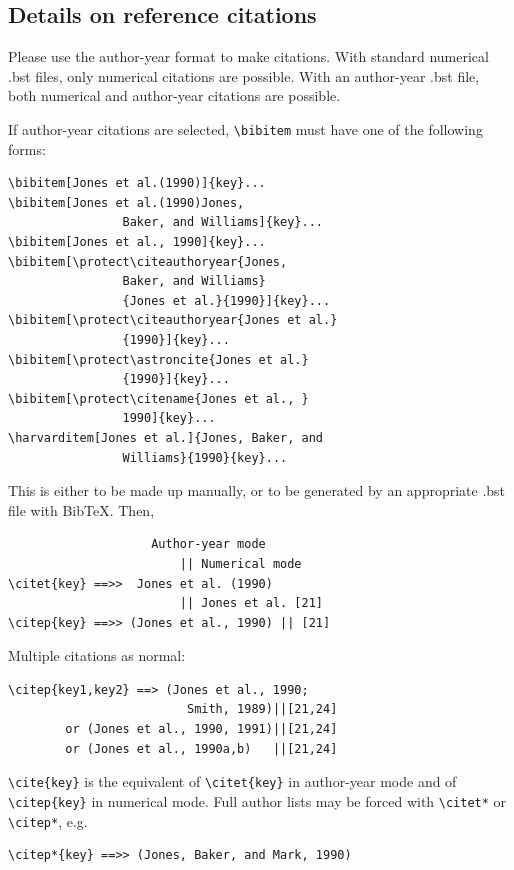 \documentclass[unnumsec,webpdf,modern,large]{mam-authoring-template}%
\theoremstyle{thmstyleone}%
\theoremstyle{thmstyletwo}%
\theoremstyle{thmstylethree}%
\begin{document}
\subsection{Details on reference citations}\label{subsec3}

Please use the author-year format to make citations. With standard numerical .bst files, only numerical citations are possible.
With an author-year .bst file, both numerical and author-year citations are possible.

If author-year citations are selected, \verb+\bibitem+ must have one of the following forms:


{\footnotesize%
\begin{verbatim}
\bibitem[Jones et al.(1990)]{key}...
\bibitem[Jones et al.(1990)Jones,
                Baker, and Williams]{key}...
\bibitem[Jones et al., 1990]{key}...
\bibitem[\protect\citeauthoryear{Jones,
                Baker, and Williams}
                {Jones et al.}{1990}]{key}...
\bibitem[\protect\citeauthoryear{Jones et al.}
                {1990}]{key}...
\bibitem[\protect\astroncite{Jones et al.}
                {1990}]{key}...
\bibitem[\protect\citename{Jones et al., }
                1990]{key}...
\harvarditem[Jones et al.]{Jones, Baker, and
                Williams}{1990}{key}...
\end{verbatim}}


This is either to be made up manually, or to be generated by an
appropriate .bst file with BibTeX. Then,


{%
\begin{verbatim}
                    Author-year mode
                        || Numerical mode
\citet{key} ==>>  Jones et al. (1990)
                        || Jones et al. [21]
\citep{key} ==>> (Jones et al., 1990) || [21]
\end{verbatim}}


\noindent
Multiple citations as normal:


{%
\begin{verbatim}
\citep{key1,key2} ==> (Jones et al., 1990;
                         Smith, 1989)||[21,24]
        or (Jones et al., 1990, 1991)||[21,24]
        or (Jones et al., 1990a,b)   ||[21,24]
\end{verbatim}}


\noindent
\verb+\cite{key}+ is the equivalent of \verb+\citet{key}+ in author-year mode
and  of \verb+\citep{key}+ in numerical mode. Full author lists may be forced with
\verb+\citet*+ or \verb+\citep*+, e.g.


{%
\begin{verbatim}
\citep*{key} ==>> (Jones, Baker, and Mark, 1990)
\end{verbatim}}
\end{document}

